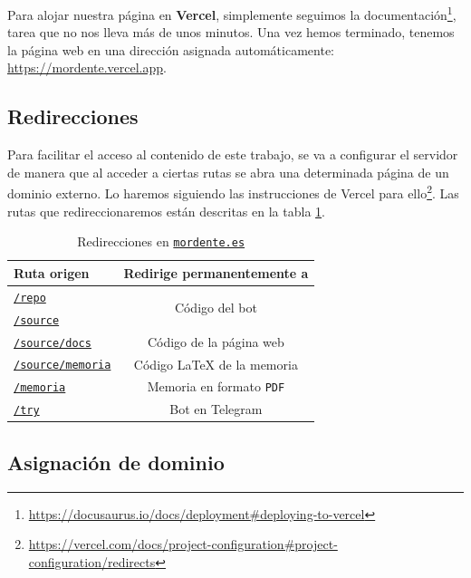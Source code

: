 Para alojar nuestra página en \textbf{Vercel}, simplemente seguimos la documentación\footnote{\url{https://docusaurus.io/docs/deployment\#deploying-to-vercel}}, tarea que no nos lleva más de unos minutos. Una vez hemos terminado, tenemos la página web en una dirección asignada automáticamente: \url{https://mordente.vercel.app}.

\subsection{Redirecciones}

Para facilitar el acceso al contenido de este trabajo, se va a configurar el servidor de manera que al acceder a ciertas rutas se abra una determinada página de un dominio externo. Lo haremos siguiendo las instrucciones de Vercel para ello\footnote{\url{https://vercel.com/docs/project-configuration\#project-configuration/redirects}}. Las rutas que redireccionaremos están descritas en la tabla \ref{tab:redirecciones}.

\begin{table}[]
    \centering
    \begin{tabular}{|l|c|}
        \hline
        \textbf{Ruta origen} & \textbf{Redirige permanentemente a} \\
        \hline
        \href{https://mordente.es/repo}{\texttt{/repo}} & \multirow{2}{*}{Código del bot} \\ \cline{1-1}
        \href{https://mordente.es/source}{\texttt{/source}} & \\ \hline
        \href{https://mordente.es/source/docs}{\texttt{/source/docs}} & Código de la página web \\
        \hline
        \href{https://mordente.es/source/memoria}{\texttt{/source/memoria}} & Código \LaTeX{} de la memoria \\
        \hline
        \href{https://mordente.es/memoria}{\texttt{/memoria}} & Memoria en formato \texttt{PDF} \\
        \hline
        \href{https://mordente.es/try}{\texttt{/try}} & Bot en Telegram \\
        \hline
    \end{tabular}
    \caption{Redirecciones en \href{https://mordente.es}{\texttt{mordente.es}}}
    \label{tab:redirecciones}
\end{table}

\subsection{Asignación de dominio}\label{subsection:asignacionDominio}

